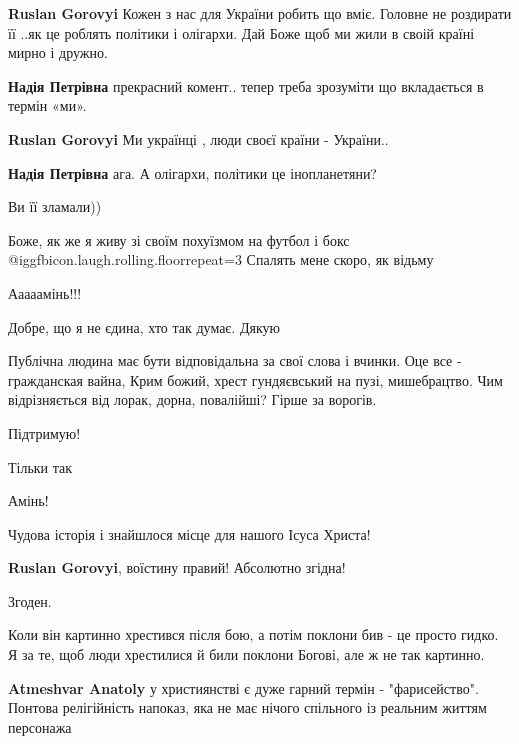 \begin{itemize}
\begin{itemize}
\textbf{Ruslan Gorovyi} Кожен з нас для України робить що вміє.
Головне не роздирати її ..як це роблять політики і олігархи.
Дай Боже щоб ми жили в своій країні мирно і дружно.

\textbf{Надія Петрівна} прекрасний комент.. тепер треба зрозуміти що вкладається в термін «ми».

\textbf{Ruslan Gorovyi} Ми українці , люди своєї країни - України..

\textbf{Надія Петрівна} ага. А олігархи, політики це інопланетяни?

Ви її зламали))

\end{itemize} %

Боже, як же я живу зі своїм похуїзмом на футбол і бокс @igg{fbicon.laugh.rolling.floor}{repeat=3} 
Спалять мене скоро, як відьму

Ааааамінь!!!

Добре, що я не єдина, хто так думає. Дякую


Публічна людина має бути відповідальна за свої слова і вчинки. Оце все -
гражданская вайна, Крим божий, хрест гундяєвський на пузі, мишебрацтво. Чим
відрізняється від лорак, дорна, повалійші? Гірше за ворогів.

Підтримую!

Тільки так

Амінь!

Чудова історія і знайшлося місце для нашого Ісуса Христа!

\textbf{Ruslan Gorovyi}, воїстину правий!
Абсолютно згідна!

Згоден.


Коли він картинно хрестився після бою, а потім поклони бив - це просто гидко. Я
за те, щоб люди хрестилися й били поклони Богові, але ж не так картинно.

\begin{itemize} %
\textbf{Atmeshvar Anatoly} у християнстві є дуже гарний термін - "фарисейство". Понтова релігійність напоказ, яка не має нічого спільного із реальним життям персонажа
\end{itemize} %


\end{itemize}
